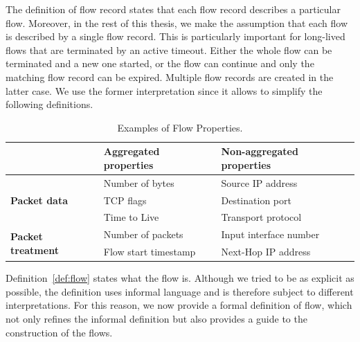 The definition of flow record states that each flow record describes a particular flow. Moreover, in the rest of this thesis, we make the assumption that each flow is described by a single flow record. This is particularly important for long-lived flows that are terminated by an active timeout. Either the whole flow can be terminated and a new one started, or the flow can continue and only the matching flow record can be expired. Multiple flow records are created in the latter case. We use the former interpretation since it allows to simplify the following definitions.

\begin{table}[ht!]
    \centering
    \begin{tabular}{lll}
    \toprule
                                               & \textbf{Aggregated properties}  & \textbf{Non-aggregated properties}  \\ \midrule
    \multirow{3}{*}{\textbf{Packet data}}      & Number of bytes                 & Source IP address                   \\ 
                                               & TCP flags                       & Destination port                    \\ 
                                               & Time to Live                    & Transport protocol                  \\ \midrule
    \multirow{2}{*}{\textbf{Packet treatment}} & Number of packets               & Input interface number              \\ 
                                               & Flow start timestamp            & Next-Hop IP address                 \\ \bottomrule
    \end{tabular}
    \caption{Examples of Flow Properties.}
    \label{tab:flow.properties}
\end{table}

Definition~\ref{def:flow} states what the flow is. Although we tried to be as explicit as possible, the definition uses informal language and is therefore subject to different interpretations. For this reason, we now provide a formal definition of flow, which not only refines the informal definition but also provides a guide to the construction of the flows.

